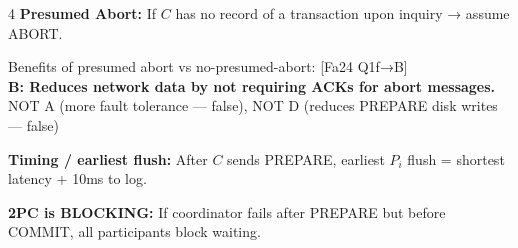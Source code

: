 \documentclass[8pt,letterpaper]{article}
\newcommand{\key}[1]{\textbf{\color{red!70!black}#1}}
\newcommand{\ans}[1]{\textbf{\color{blue!80!black}#1}}
\newcommand{\qref}[1]{{\fontsize{3.5}{4}\selectfont\color{purple!60!black}[#1]}}
\begin{document}
\begin{multicols*}{4}
\key{Presumed Abort:} If $C$ has no record of a transaction upon inquiry → assume ABORT.
\begin{ansbox}
Benefits of presumed abort vs no-presumed-abort: \qref{Fa24 Q1f→B}\\
\ans{B: Reduces network data by not requiring ACKs for abort messages.}\\
NOT A (more fault tolerance — false), NOT D (reduces PREPARE disk writes — false)
\end{ansbox}

\key{Timing / earliest flush:} After $C$ sends PREPARE, earliest $P_i$ flush = shortest latency + 10ms to log.

\key{2PC is BLOCKING:} If coordinator fails after PREPARE but before COMMIT, all participants block waiting.

\end{multicols*}
\newpage
\end{document}
